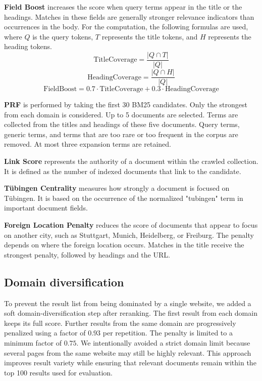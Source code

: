 \documentclass[10pt,a4paper]{article}
\begin{document}
\textbf{Field Boost} increases the score when query terms appear in the title or the headings. 
Matches in these fields are generally stronger relevance indicators than occurrences in the body.
For the computation, the following formulas are used,
where $Q$ is the query tokens, $T$ represents the title tokens, and $H$ represents the heading tokens.
\[
\mathrm{TitleCoverage} =
\frac{|Q \cap T|}{|Q|}
\]
\[
\mathrm{HeadingCoverage} =
\frac{|Q \cap H|}{|Q|}
\]
\[
\mathrm{FieldBoost} =
0.7 \cdot \mathrm{TitleCoverage}
+
0.3 \cdot \mathrm{HeadingCoverage}
\]

\textbf{PRF} is performed by taking the first 30 BM25 candidates. 
Only the strongest from each domain is considered. Up to 5 documents are selected.
Terms are collected from the titles and headings of these five documents.
Query terms, generic terms, and terms that are too rare or too frequent in the corpus are removed.
At most three expansion terms are retained.

\textbf{Link Score} represents the authority of a document within the crawled collection. 
It is defined as the number of indexed documents that link to the candidate.

\textbf{Tübingen Centrality} measures how strongly a document is focused on Tübingen. 
It is based on the occurrence of the normalized "tubingen" term in important document fields.

\textbf{Foreign Location Penalty} reduces the score of documents that appear to focus on another city, such as Stuttgart, Munich, Heidelberg, or Freiburg.
The penalty depends on where the foreign location occurs. Matches in the title receive the strongest penalty, followed by headings and the URL.

\subsection{Domain diversification}
To prevent the result list from being dominated by a single website, we added a soft
domain-diversification step after reranking. The first result from each domain keeps
its full score. Further results from the same domain are progressively penalized using
a factor of $0.93$ per repetition. The penalty is limited to a minimum factor of $0.75$.
We intentionally avoided a strict domain limit because several pages from the same
website may still be highly relevant. This approach improves result variety while
ensuring that relevant documents remain within the top 100 results used for evaluation.
\end{document}
